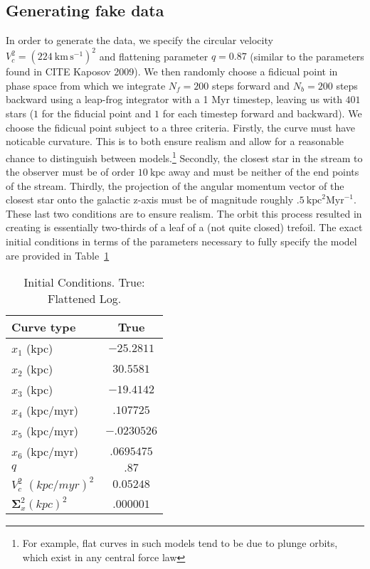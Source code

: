 \documentclass[12pt,preprint]{aastex}
\theoremstyle{plain}
\theoremstyle{definition}
\newcommand{\unit}[1]{\mathrm{#1}}
\newcommand{\kpc}{\unit{kpc}}
\newcommand{\Myr}{\unit{Myr}}
\newcommand{\km}{\unit{km}}
\newcommand{\s}{\unit{s}}
\newcommand{\kmps}{\km\,\s^{-1}}
\begin{document}
\subsection{\label{sec:FakeData}Generating fake data}
In order to generate the data, we specify the circular velocity $V_c^2 = (224~\kmps)^2$ 
and flattening parameter $q=0.87$ (similar to the parameters found in CITE Kaposov 2009).
We then randomly choose a fidicual point in phase space from which we integrate
$N_f = 200$ steps forward and $N_b = 200$ steps backward using a leap-frog integrator
with a 1 Myr timestep, leaving us with $401$ stars ($1$ for the fiducial point and
$1$ for each timestep forward and backward). We choose the fidicual point subject 
to a three criteria. Firstly, the curve must have noticable curvature. This is 
to both ensure realism and allow for a reasonable chance to distinguish between models.\footnote{For example, flat curves in such models tend to be due to plunge orbits, which exist in any central force law}
Secondly, the closest star in the stream to the observer must be of order $10~\kpc$ away
and must be neither of the end points of the stream. Thirdly, the projection of
the angular momentum vector of the closest star onto the galactic z-axis must be 
of magnitude roughly $.5~\kpc^2\Myr^{-1}$. These last two conditions are to ensure realism.
The orbit this process resulted in creating is essentially two-thirds of a leaf of a 
(not quite closed) trefoil. The exact initial conditions in terms of the parameters
necessary to fully specify the model are provided in Table~\ref{table:InitConds}

\begin{table}\label{table:InitConds}
\centering
\caption{Initial Conditions. True: Flattened Log.} 
\begin{tabular}{| l | c | }
\hline
Curve type & True  \\
\hline
$x_1$ (kpc) & $-25.2811$  \\ \hline
$x_2$ (kpc) & $30.5581$ \\ \hline
$x_3$ (kpc) & $-19.4142$ \\ \hline
$x_4$ (kpc/myr) & $ .107725$ \\ \hline
$x_5$ (kpc/myr) & $-.0230526 $ \\ \hline
$x_6$ (kpc/myr) & $.0695475$ \\ \hline
$q$ & $.87$ \\ \hline
$V_c^2$ $(kpc/myr)^2$ & $0.05248$ \\ \hline
$\mathbf{\Sigma}_x^2 (kpc)^2$ & $.000001 $ \\
\hline
\end{tabular}
\end{table}
\end{document}
